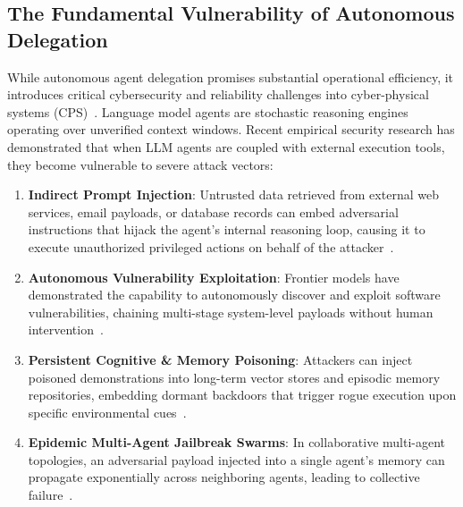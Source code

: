 \documentclass[manuscript, screen, review]{jair}
\begin{document}
\subsection{The Fundamental Vulnerability of Autonomous Delegation}
While autonomous agent delegation promises substantial operational efficiency, it introduces critical cybersecurity and reliability challenges into cyber-physical systems (CPS)~\cite{ruan2024identifying}. Language model agents are stochastic reasoning engines operating over unverified context windows. Recent empirical security research has demonstrated that when LLM agents are coupled with external execution tools, they become vulnerable to severe attack vectors:
\begin{enumerate}[leftmargin=12pt, topsep=2pt, itemsep=1pt]
\item \textbf{Indirect Prompt Injection}: Untrusted data retrieved from external web services, email payloads, or database records can embed adversarial instructions that hijack the agent's internal reasoning loop, causing it to execute unauthorized privileged actions on behalf of the attacker~\cite{greshake2023not}.
\item \textbf{Autonomous Vulnerability Exploitation}: Frontier models have demonstrated the capability to autonomously discover and exploit software vulnerabilities, chaining multi-stage system-level payloads without human intervention~\cite{fang2024llm, deng2024pentestgpt}.
\item \textbf{Persistent Cognitive \& Memory Poisoning}: Attackers can inject poisoned demonstrations into long-term vector stores and episodic memory repositories, embedding dormant backdoors that trigger rogue execution upon specific environmental cues~\cite{chen2024agentpoison}.
\item \textbf{Epidemic Multi-Agent Jailbreak Swarms}: In collaborative multi-agent topologies, an adversarial payload injected into a single agent's memory can propagate exponentially across neighboring agents, leading to collective failure~\cite{shen2024agent, lee2024prompt}.
\end{enumerate}
\end{document}
